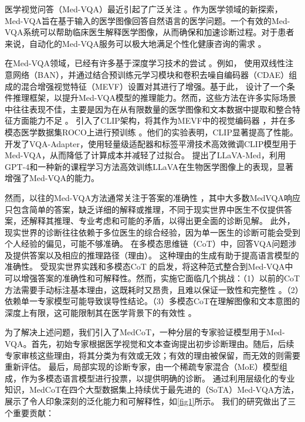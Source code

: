 \documentclass[11pt]{article}
\begin{document}
医学视觉问答（Med-VQA）最近引起了广泛关注 \cite{chen2022align, gong2021cross, ren2020cgmvqa, khare2021mmbert}。作为医学领域的新探索，Med-VQA旨在基于输入的医学图像回答自然语言的医学问题。一个有效的Med-VQA系统可以帮助临床医生解释医学图像，从而确保和加速诊断过程。对于患者来说，自动化的Med-VQA服务可以极大地满足个性化健康咨询的需求 \cite{liu2023parameter}。

在Med-VQA领域，已经有许多基于深度学习技术的尝试 \cite{tiong2022plug, banerjee2020weaqa, changpinyo2022all, liu2023chatgpt, gai2024medthink}。例如，\citet{nguyen2019overcoming} 使用双线性注意网络（BAN）\cite{kim2018bilinear}，并通过结合预训练元学习模块和卷积去噪自编码器（CDAE）组成的混合增强视觉特征（MEVF）设置对其进行了增强。基于此，\citet{zhan2020medical} 设计了一个条件推理框架，以提升Med-VQA模型的推理能力。然而，这些方法在许多实际场景中往往表现不佳，主要是因为在从有限数量的医学图像和文本数据中提取和整合特征方面能力不足 \cite{eslami2021does, song2022clip, wang2022clip}。
\citet{eslami2021does} 引入了CLIP架构，将其作为MEVF中的视觉编码器 \cite{nguyen2019overcoming}，并在多模态医学数据集ROCO上进行预训练 \cite{pelka2018radiology}。他们的实验表明，CLIP显著提高了性能。\citet{liu2023parameter} 开发了VQA-Adapter，使用轻量级适配器和标签平滑技术高效微调CLIP模型用于Med-VQA，从而降低了计算成本并减轻了过拟合。
\citet{li2024llava} 提出了LLaVA-Med，利用GPT-4和一种新的课程学习方法高效训练LLaVA在生物医学图像上的表现，显著增强了Med-VQA的能力。

然而，以往的Med-VQA方法通常关注于答案的准确性 \cite{nguyen2019overcoming,liu2023parameter,zhan2020medical}，其中大多数MedVQA响应只包含简单的答案，缺乏详细的解释或推理，不同于现实世界中医生不仅提供答案，还解释其推理、专业考虑和可能的矛盾，以得出更全面的诊断见解。
此外，现实世界的诊断往往依赖于多位医生的综合经验，因为单一医生的诊断可能会受到个人经验的偏见，可能不够准确。
在多模态思维链（CoT）中，回答VQA问题涉及提供答案以及相应的推理路径（理由）。
这种理由的生成有助于提高语言模型的准确性。
受现实世界实践和多模态CoT \citet{zhang2023multimodal,zheng2023ddcot} 的启发，将这种范式整合到Med-VQA中可以增强答案的准确性和可解释性。然而，实施它面临几个挑战：（1）以前的CoT方法需要手动标注基本理由，这既耗时又昂贵，且难以保证一致性和完整性 \cite{zhang2023multimodal,zheng2023ddcot}。（2）依赖单一专家模型可能导致误导性结论。（3）多模态CoT在理解图像和文本意图的深度上有限，这可能限制其在医学背景下的有效性 \cite{zhang2023multimodal}。

为了解决上述问题，我们引入了MedCoT，一种分层的专家验证模型用于Med-VQA。首先，初始专家根据医学视觉和文本查询提出初步诊断理由。随后，后续专家审核这些理由，将其分类为有效或无效；有效的理由被保留，而无效的则需要重新评估。
最后，局部实现的诊断专家，由一个稀疏专家混合（MoE）模型组成，作为多模态语言模型进行投票，以提供明确的诊断。
通过利用层级化的专业知识，MedCoT在四个大型数据集上持续优于最先进的（SoTA）Med-VQA方法，展示了令人印象深刻的泛化能力和可解释性，如\autoref{fig1}所示。
我们的研究做出了三个重要贡献：
\end{document}
